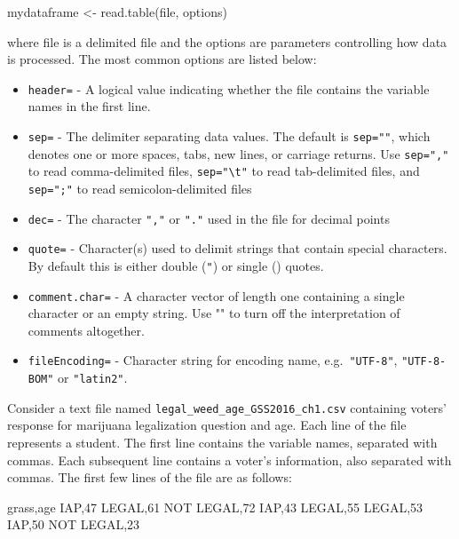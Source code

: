 \documentclass[
]{book}
\newenvironment{Shaded}{\begin{snugshade}}{\end{snugshade}}
\newcommand{\DecValTok}[1]{\textcolor[rgb]{0.00,0.00,0.81}{#1}}
\newcommand{\FunctionTok}[1]{\textcolor[rgb]{0.00,0.00,0.00}{#1}}
\newcommand{\NormalTok}[1]{#1}
\newcommand{\OtherTok}[1]{\textcolor[rgb]{0.56,0.35,0.01}{#1}}
\providecommand{\tightlist}{%
  \setlength{\itemsep}{0pt}\setlength{\parskip}{0pt}}
\begin{document}
\begin{Shaded}
\begin{Highlighting}[]
\NormalTok{mydataframe }\OtherTok{\textless{}{-}} \FunctionTok{read.table}\NormalTok{(file, options)}
\end{Highlighting}
\end{Shaded}

where file is a delimited file and the options are parameters controlling how data is processed. The most common options are listed below:

\begin{itemize}
\tightlist
\item
  \texttt{header=} - A logical value indicating whether the file contains the variable names in the first line.
\item
  \texttt{sep=} - The delimiter separating data values. The default is \texttt{sep=""}, which denotes one or more spaces, tabs, new lines, or carriage returns. Use \texttt{sep=","} to read comma-delimited files, \texttt{sep="\textbackslash{}t"} to read tab-delimited files, and \texttt{sep=";"} to read semicolon-delimited files
\item
  \texttt{dec=} - The character \texttt{","} or \texttt{"."} used in the file for decimal points
\item
  \texttt{quote=} - Character(s) used to delimit strings that contain special characters. By default this is either double (\texttt{"}) or single (\texttt{\textquotesingle{}}) quotes.
\item
  \texttt{comment.char=} - A character vector of length one containing a single character or an empty string. Use "" to turn off the interpretation of comments altogether.
\item
  \texttt{fileEncoding=} - Character string for encoding name, e.g.~\texttt{"UTF-8"}, \texttt{"UTF-8-BOM"} or \texttt{"latin2"}.
\end{itemize}

Consider a text file named \texttt{legal\_weed\_age\_GSS2016\_ch1.csv} containing voters' response for marijuana legalization question and age. Each line of the file represents a student. The first line contains the variable names, separated with commas. Each subsequent line contains a voter's information, also separated with commas. The first few lines of the file are as follows:

\begin{Shaded}
\begin{Highlighting}[]
\NormalTok{grass,age}
\NormalTok{IAP,}\DecValTok{47}
\NormalTok{LEGAL,}\DecValTok{61}
\NormalTok{NOT LEGAL,}\DecValTok{72}
\NormalTok{IAP,}\DecValTok{43}
\NormalTok{LEGAL,}\DecValTok{55}
\NormalTok{LEGAL,}\DecValTok{53}
\NormalTok{IAP,}\DecValTok{50}
\NormalTok{NOT LEGAL,}\DecValTok{23}
\end{Highlighting}
\end{Shaded}
\end{document}
